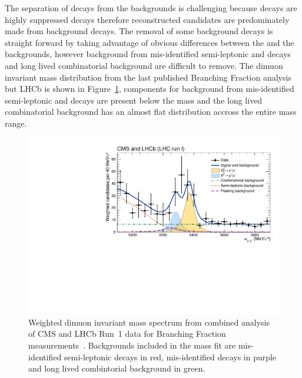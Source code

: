The separation of \bsmumu decays from the backgrounds is challenging because \bsmumu decays are highly suppressed decays therefore reconstructed candidates are predominately made from background decays.
The removal of some background decays is straight forward by taking advantage of obvious differences between the \bsmumu and the backgrounds, however background from mis-identified semi-leptonic and \bhh decays and long lived combinatorial background are difficult to remove. The dimuon invariant mass distribution from the last published \bmumu Branching Fraction analysis but LHCb is shown in Figure~\ref{fig:LHCbCMS}, components for background from mis-identified semi-leptonic and \bhh decays are present below the \bs mass and the long lived combinatorial background has an almost flat distribution accross the entire mass range. 


\begin{figure}[htbp]
    \centering
        \includegraphics[width= 0.8 \textwidth]{./Figs/Selection/CMSLHCb_fig2.pdf}
    \caption{Weighted dimuon invariant mass spectrum from combined analysis of CMS and LHCb Run~1 data for \bmumu Branching Fraction measurements~\cite{CMS:2014xfa}. Backgrounds included in the mass fit are mis-identified semi-leptonic decays in red, mis-identified \bhh decays in purple and long lived combintorial background in green. }
    \label{fig:LHCbCMS}
\end{figure}

